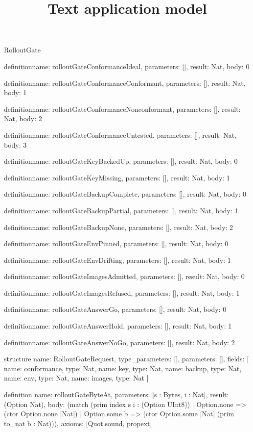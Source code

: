 \begin{lexlean}{RolloutGate}
\title{Text application model}
\begin{semanticmodule}
definition{name: rolloutGateConformanceIdeal, parameters: [], result: Nat, body: 0}

definition{name: rolloutGateConformanceConformant, parameters: [], result: Nat, body: 1}

definition{name: rolloutGateConformanceNonconformant, parameters: [], result: Nat, body: 2}

definition{name: rolloutGateConformanceUntested, parameters: [], result: Nat, body: 3}

definition{name: rolloutGateKeyBackedUp, parameters: [], result: Nat, body: 0}

definition{name: rolloutGateKeyMissing, parameters: [], result: Nat, body: 1}

definition{name: rolloutGateBackupComplete, parameters: [], result: Nat, body: 0}

definition{name: rolloutGateBackupPartial, parameters: [], result: Nat, body: 1}

definition{name: rolloutGateBackupNone, parameters: [], result: Nat, body: 2}

definition{name: rolloutGateEnvPinned, parameters: [], result: Nat, body: 0}

definition{name: rolloutGateEnvDrifting, parameters: [], result: Nat, body: 1}

definition{name: rolloutGateImagesAdmitted, parameters: [], result: Nat, body: 0}

definition{name: rolloutGateImagesRefused, parameters: [], result: Nat, body: 1}

definition{name: rolloutGateAnswerGo, parameters: [], result: Nat, body: 0}

definition{name: rolloutGateAnswerHold, parameters: [], result: Nat, body: 1}

definition{name: rolloutGateAnswerNoGo, parameters: [], result: Nat, body: 2}

structure{
  name: RolloutGateRequest,
  type_parameters: [],
  parameters: [],
  fields: [
    {name: conformance, type: Nat},
    {name: key, type: Nat},
    {name: backup, type: Nat},
    {name: env, type: Nat},
    {name: images, type: Nat}
  ]
}

definition{
  name: rolloutGateByteAt,
  parameters: [s : Bytes, i : Nat],
  result: (Option Nat),
  body: (match (prim index s i : (Option UInt8))
    | Option.none => (ctor Option.none [Nat])
    | Option.some b => (ctor Option.some [Nat] (prim to_nat b : Nat))),
  axioms: [Quot.sound, propext]
}


\end{semanticmodule}
\end{lexlean}
